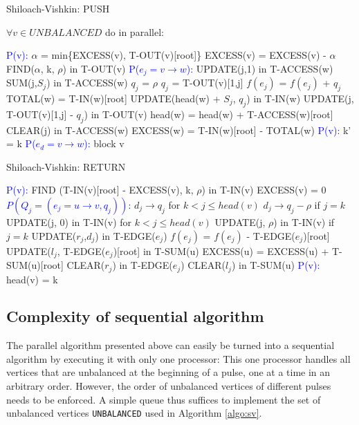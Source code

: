 \documentclass[a4paper,10pt, twocolumn]{article}
\begin{document}
\begin{algorithm}
\caption{Shiloach-Vishkin: PUSH}
\label{algo:sv_push}
$\forall v \in UNBALANCED$ do in parallel:
\begin{algorithmic}[1]
		\State \textcolor{blue}{P(v):}
		\State $\alpha$ = min\{EXCESS(v), T-OUT(v)[root]\} 
		\State EXCESS(v) = EXCESS(v) - $\alpha$
		\State FIND($\alpha$, k, $\rho$) in T-OUT(v)
		\State \textcolor{blue}{P($e_j = v \rightarrow w$):}
 		\State UPDATE(j,1) in T-ACCESS(w)
		\State SUM(j,$S_j$) in T-ACCESS(w)
			$q_j$ = $\rho$
		\Else
			\State $q_j$ = T-OUT(v)[1,j]
		\EndIf
		\State $f(e_j)$ = $f(e_j)$ + $q_j$
		\State TOTAL(w) = T-IN(w)[root]
		\State UPDATE(head(w) + $S_j$, $q_j$) in T-IN(w)
		\State UPDATE(j, T-OUT(v)[1,j] - $q_j$) in T-OUT(v)
		\State head(w) = head(w) + T-ACCESS(w)[root] 
		\State CLEAR(j) in T-ACCESS(w)
		\State EXCESS(w) = T-IN(w)[root] - TOTAL(w)
		\EndIf
		\State \textcolor{blue}{P(v):} k' = k
		\State \textcolor{blue}{P($e_d = v \rightarrow w$):}
			\State block v
		\EndIf
 	\EndFunction
\end{algorithmic}
\end{algorithm}

\begin{algorithm}
\caption{Shiloach-Vishkin: RETURN}
\label{algo:sv_return}
\begin{algorithmic}[1]
		\State \textcolor{blue}{P(v):}
		\State FIND (T-IN(v)[root] - EXCESS(v), k, $\rho$) in T-IN(v)
		\State EXCESS(v) = 0
		\State \textcolor{blue}{$P(Q_j = (e_j = u \rightarrow v, q_j))$:}
		\State $d_j \rightarrow q_j$ for $k < j \leq head(v)$
		\State $d_j \rightarrow q_j - \rho$ if $j = k$
		\State UPDATE(j, 0) in T-IN(v) for $k < j \leq head(v)$
		\State UPDATE(j, $\rho$) in T-IN(v) if $j = k$
		\State UPDATE($r_j$,$d_j$) in T-EDGE($e_j$)
		\State $f(e_j)$ = $f(e_j)$ - T-EDGE($e_j$)[root]
		\State UPDATE($l_j$, T-EDGE($e_j$)[root] in T-SUM(u)
		\State EXCESS(u) = EXCESS(u) + T-SUM(u)[root]
		\State CLEAR($r_j$) in T-EDGE($e_j$)
		\State CLEAR($l_j$) in T-SUM(u)
		\State \textcolor{blue}{P(v):}
		\State head(v) = k
	\EndFunction
\end{algorithmic}
\end{algorithm}

\subsection{Complexity of sequential algorithm}
\label{sec:sv_seq}
The parallel algorithm presented above can easily be turned into a sequential algorithm by executing it with only one processor: This one processor handles all vertices that are unbalanced at the beginning of a pulse, one at a time in an arbitrary order. However, the order of unbalanced vertices of different pulses needs to be enforced. A simple queue thus suffices to implement the set of unbalanced vertices \lstinline|UNBALANCED| used in Algorithm \ref{algo:sv}.
\end{document}
